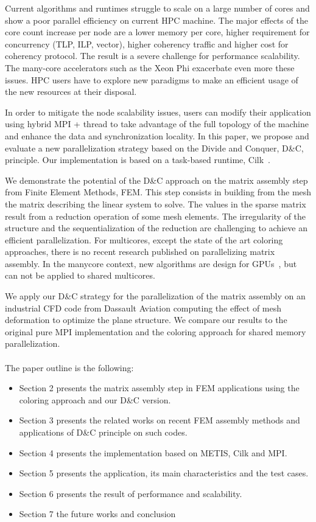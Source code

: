 \documentclass{IOS-Book-Article}
\begin{document}
Current algorithms and runtimes struggle to scale on a large number of cores and show a poor parallel efficiency on current HPC machine. 
The major effects of the core count increase per node are a lower memory per core, higher requirement for concurrency (TLP, ILP, vector), higher coherency traffic and higher cost for coherency protocol.
The result is a severe challenge for performance scalability. The many-core accelerators such as the Xeon Phi exacerbate even more these issues.
HPC users have to explore new paradigms to make an efficient usage of the new resources at their disposal. 

In order to mitigate the node scalability issues, users can modify their application using hybrid MPI + thread to take advantage of the full topology of the machine and enhance the data and synchronization locality.
In this paper, we propose and evaluate a new parallelization strategy based on the Divide and Conquer, D\&C, principle. Our implementation is based on a task-based runtime, Cilk~\cite{cilk5}. 

We demonstrate the potential of the D\&C approach on the matrix assembly step from Finite Element Methods, FEM.
This step consists in building from the mesh the matrix describing the linear system to solve.
The values in the sparse matrix result from a reduction operation of some mesh elements.
The irregularity of the structure and the sequentialization of the reduction are challenging to achieve an efficient parallelization.
For multicores, except the state of the art coloring approaches, there is no recent research published on parallelizing matrix assembly.
In the manycore context, new algorithms are design for GPUs~\cite{Stanford,CPUGPUasm}, but can not be applied to shared multicores.

We apply our D\&C strategy for the parallelization of the matrix assembly on an industrial CFD code from Dassault Aviation computing the effect of mesh deformation to optimize the plane structure.
We compare our results to the original pure MPI implementation and the coloring approach for shared memory parallelization.
\\\\
The paper outline is the following:
\begin{itemize}
\item Section 2 presents the matrix assembly step in FEM applications using the coloring approach and our D\&C version.
\item Section 3 presents the related works on recent FEM assembly methods and applications of D\&C principle on such codes.
\item Section 4 presents the implementation based on METIS, Cilk and MPI.
\item Section 5 presents the application, its main characteristics and the test cases.
\item Section 6 presents the result of performance and scalability. 
\item Section 7 the future works and conclusion
\end{itemize}
\end{document}
